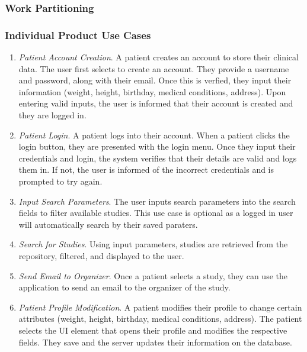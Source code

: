 \documentclass[12pt, titlepage]{article}
\begin{document}
\subsubsection{Work Partitioning}

\subsubsection{Individual Product Use Cases}

\begin{enumerate}

\item \textit{Patient Account Creation}. A patient creates an account to store their clinical data. The user first selects to create an account. They provide a username and password, along with their email. Once this is verfied, they input their information (weight, height, birthday, medical conditions, address). Upon entering valid inputs, the user is informed that their account is created and they are logged in.

\item \textit{Patient Login}. A patient logs into their account. When a patient clicks the login button, they are presented with the login menu. Once they input their credentials and login, the system verifies that their details are valid and logs them in. If not, the user is informed of the incorrect credentials and is prompted to try again.

\item \textit{Input Search Parameters}. The user inputs search parameters into the search fields to filter available studies. This use case is optional as a logged in user will automatically search by their saved paraters.

\item \textit{Search for Studies}. Using input parameters, studies are retrieved from the repository, filtered, and displayed to the user. 

\item \textit{Send Email to Organizer}. Once a patient selects a study, they can use the application to send an email to the organizer of the study.

\item \textit{Patient Profile Modification}. A patient modifies their profile to change certain attributes (weight, height, birthday, medical conditions, address). The patient selects the UI element that opens their profile and modifies the respective fields. They save and the server updates their information on the database. 


\end{enumerate}
\end{document}
